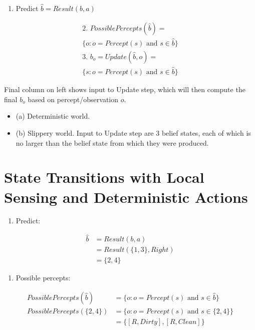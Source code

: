 \documentclass[11pt]{article}
\begin{document}
\begin{enumerate}
\item Predict \(\hat{b} = Result(b, a)\)
\end{enumerate}
\begin{multline*}
\text{2. } PossiblePercepts(\hat{b}) = \\
\{o : o = Percept(s) \text{ and } s \in \hat{b}\}
\end{multline*}
\begin{multline*}
\text{3. } b_o = Update(\hat{b},o) = \\
\{s : o = Percept(s) \text{ and } s \in \hat{b}\}
\end{multline*}


Final column on left shows input to Update step, which will then compute the final \(b_o\) based on percept/observation \(o\).

\begin{itemize}
\item (a) Deterministic world.
\item (b) Slippery world. Input to Update step are 3 belief states, each of which is no larger than the belief state from which they were produced.
\end{itemize}
\section{State Transitions with Local Sensing and Deterministic Actions}
\label{sec:org913e6c6}




\begin{enumerate}
\item Predict:
\end{enumerate}
\vspace{-.25in}
\begin{align*}
\hat{b} &= Result(b, a)\\
        &= Result(\{1, 3\}, Right)\\
        &= \{2, 4\}
\end{align*}

\begin{enumerate}
\item Possible percepts:
\end{enumerate}
\vspace{-.25in}
\begin{align*}
PossiblePercepts(\hat{b})  &= \{o : o = Percept(s) \text{ and } s \in \hat{b}\}\\
PossiblePercepts(\{2, 4\}) &= \{o : o = Percept(s) \text{ and } s \in \{2, 4\}\}\\
                           &= \{[R, Dirty], [R, Clean]\}
\end{align*}
\end{document}
